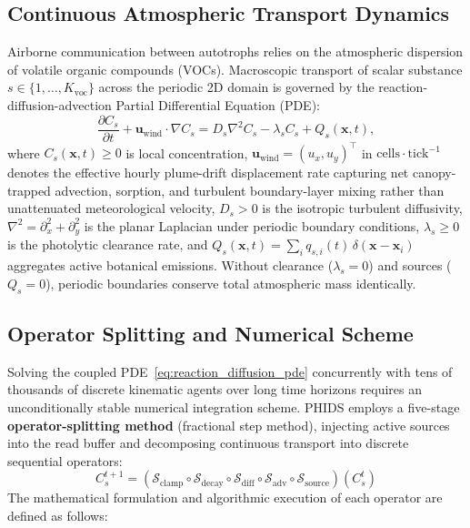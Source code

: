 \subsection{Continuous Atmospheric Transport Dynamics}
\label{subsec:atmospheric_transport}

Airborne communication between autotrophs relies on the atmospheric dispersion of volatile organic compounds (VOCs). Macroscopic transport of scalar substance $s \in \{1, \dots, K_{\text{voc}}\}$ across the periodic 2D domain is governed by the reaction-diffusion-advection Partial Differential Equation (PDE):
\begin{equation}
  \frac{\partial C_s}{\partial t} + \mathbf{u}_{\text{wind}} \cdot \nabla C_s = D_s \nabla^2 C_s - \lambda_s C_s + Q_s(\mathbf{x}, t),
  \label{eq:reaction_diffusion_pde}
\end{equation}
where $C_s(\mathbf{x}, t) \ge 0$ is local concentration, $\mathbf{u}_{\text{wind}} = (u_x, u_y)^{\top}$ in $\text{cells}\cdot\text{tick}^{-1}$ denotes the effective hourly plume-drift displacement rate capturing net canopy-trapped advection, sorption, and turbulent boundary-layer mixing rather than unattenuated meteorological velocity, $D_s > 0$ is the isotropic turbulent diffusivity, $\nabla^2 = \partial_x^2 + \partial_y^2$ is the planar Laplacian under periodic boundary conditions, $\lambda_s \ge 0$ is the photolytic clearance rate, and $Q_s(\mathbf{x}, t) = \sum_{i} q_{s,i}(t)\,\delta(\mathbf{x} - \mathbf{x}_i)$ aggregates active botanical emissions. Without clearance ($\lambda_s = 0$) and sources ($Q_s = 0$), periodic boundaries conserve total atmospheric mass identically.

\subsection{Operator Splitting and Numerical Scheme}
\label{subsec:operator_splitting}

Solving the coupled PDE~\eqref{eq:reaction_diffusion_pde} concurrently with tens of thousands of discrete kinematic agents over long time horizons requires an unconditionally stable numerical integration scheme. PHIDS employs a five-stage \textbf{operator-splitting method} (fractional step method), injecting active sources into the read buffer and decomposing continuous transport into discrete sequential operators:
\begin{equation}
  C_s^{t+1} = \left( \mathcal{S}_{\text{clamp}} \circ \mathcal{S}_{\text{decay}} \circ \mathcal{S}_{\text{diff}} \circ \mathcal{S}_{\text{adv}} \circ \mathcal{S}_{\text{source}} \right) \left( C_s^t \right)
  \label{eq:operator_splitting_pipeline}
\end{equation}
The mathematical formulation and algorithmic execution of each operator are defined as follows:

